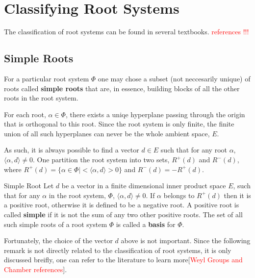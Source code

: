 \chapter{Classifying Root Systems}
The classification of root systems can be found in several textbooks. \textcolor{red}{references !!!}

\section{Simple Roots}

For a particular root system $\Phi$ one may chose a subset (not neccesarily unique) of
roots called \textbf{simple roots} that are, in essence, building blocks of all the other roots
in the root system. \newline

For each root, $\alpha \in \Phi$, there exists a uniqe hyperplane passing through the origin that
is orthogonal to this root. Since the root system is only finite, the finite union of all
such hyperplanes can never be the whole ambient space, $E$. \newline

As such, it is always possible to find a vector $d \in E$ such that for any root $\alpha$, $\langle \alpha, d \rangle \not= 0$.
One partition the root system into two sets, $R^+(d)$ and $R^-(d)$, where $R^+(d) = \{
    \alpha \in \Phi |  <\langle \alpha, d \rangle > 0\}$ and $R^-(d) = -R^+(d)$. \newline

\begin{nameddefinition}{Simple Root}
    Let $d$ be a vector in a finite dimensional inner product space $E$, such that for any $\alpha$ in the root system, $\Phi$,
    $\langle \alpha, d \rangle \not= 0$. 
    If $\alpha$ belongs to $R^+(d)$ then it is a positive root, otherwise it is defined
    to be a negative root.
    A positive root is called \textbf{simple} if it is not the sum of any two other positive roots.
    The set of all such simple roots of a root system $\Phi$ is called a \textbf{basis} for $\Phi$.
\end{nameddefinition}

Fortunately, the choice of the vector $d$ above is not important.
Since the following remark is not directly related to the classification of root systems, it is only
discussed breifly, one can refer to the literature to learn more[\textcolor{red}{Weyl Groups and Chamber references}]. \newline

